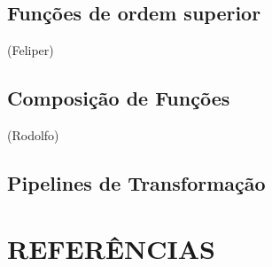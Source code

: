 \documentclass[date,twocolumn,a4paper]{ppgem}
\begin{document}
    \subsection{Funções de ordem superior}
    (Feliper)
    \subsection{Composição de Funções}
    (Rodolfo)
    \subsection{Pipelines de Transformação}

    \section{REFERÊNCIAS}\\
    
    
\end{document}
